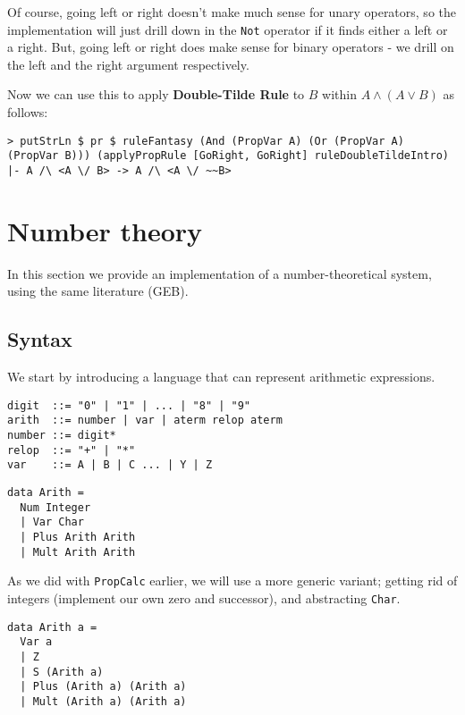 \documentclass{article}
\begin{document}
Of course, going left or right doesn't make much sense for unary operators, so the implementation will just drill down in the \texttt{Not} operator if it finds either a left or a right. But, going left or right does make sense for binary operators - we drill on the left and the right argument respectively.

Now we can use this to apply \textbf{Double-Tilde Rule} to $B$ within $A \land (A \lor B)$ as follows:

\begin{lstlisting}
> putStrLn $ pr $ ruleFantasy (And (PropVar A) (Or (PropVar A) (PropVar B))) (applyPropRule [GoRight, GoRight] ruleDoubleTildeIntro)
|- A /\ <A \/ B> -> A /\ <A \/ ~~B>
\end{lstlisting}

\section{Number theory}

In this section we provide an implementation of a number-theoretical system, using the same literature (GEB).

\subsection{Syntax}

We start by introducing a language that can represent arithmetic expressions.

\begin{minipage}{0.49\textwidth}
\begin{lstlisting}
digit  ::= "0" | "1" | ... | "8" | "9"
arith  ::= number | var | aterm relop aterm
number ::= digit*
relop  ::= "+" | "*"
var    ::= A | B | C ... | Y | Z
\end{lstlisting}
\end{minipage}
\begin{minipage}{0.49\textwidth}
\begin{lstlisting}
data Arith =
  Num Integer
  | Var Char
  | Plus Arith Arith
  | Mult Arith Arith
\end{lstlisting}
\end{minipage}

As we did with \texttt{PropCalc} earlier, we will use a more generic variant; getting rid of integers (implement our own zero and successor), and abstracting \texttt{Char}.

\begin{lstlisting}
data Arith a =
  Var a
  | Z
  | S (Arith a)
  | Plus (Arith a) (Arith a)
  | Mult (Arith a) (Arith a)
\end{lstlisting}
\end{document}
